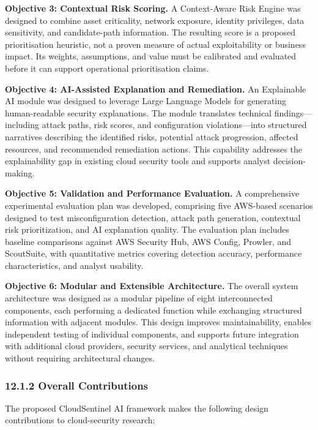 \textbf{Objective 3: Contextual Risk Scoring.} A Context-Aware Risk Engine was designed to combine asset criticality, network exposure, identity privileges, data sensitivity, and candidate-path information. The resulting score is a proposed prioritisation heuristic, not a proven measure of actual exploitability or business impact. Its weights, assumptions, and value must be calibrated and evaluated before it can support operational prioritisation claims.

\textbf{Objective 4: AI-Assisted Explanation and Remediation.} An Explainable AI module was designed to leverage Large Language Models for generating human-readable security explanations. The module translates technical findings---including attack paths, risk scores, and configuration violations---into structured narratives describing the identified risks, potential attack progression, affected resources, and recommended remediation actions. This capability addresses the explainability gap in existing cloud security tools and supports analyst decision-making.

\textbf{Objective 5: Validation and Performance Evaluation.} A comprehensive experimental evaluation plan was developed, comprising five AWS-based scenarios designed to test misconfiguration detection, attack path generation, contextual risk prioritization, and AI explanation quality. The evaluation plan includes baseline comparisons against AWS Security Hub, AWS Config, Prowler, and ScoutSuite, with quantitative metrics covering detection accuracy, performance characteristics, and analyst usability.

\textbf{Objective 6: Modular and Extensible Architecture.} The overall system architecture was designed as a modular pipeline of eight interconnected components, each performing a dedicated function while exchanging structured information with adjacent modules. This design improves maintainability, enables independent testing of individual components, and supports future integration with additional cloud providers, security services, and analytical techniques without requiring architectural changes.

\subsubsection{12.1.2 Overall Contributions}

The proposed CloudSentinel AI framework makes the following design contributions to cloud-security research:

